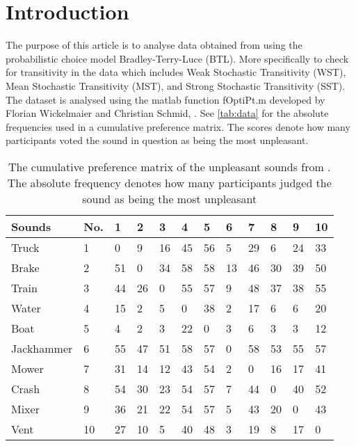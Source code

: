 \section*{Introduction}
\label{Introduktion}

The purpose of this article is to analyse data obtained from \textcite{Ellermeier2004} using the probabilistic choice model Bradley-Terry-Luce (BTL). More specifically to check for transitivity in the data which includes Weak Stochastic Transitivity (WST), Mean Stochastic Transitivity (MST), and Strong Stochastic Transitivity (SST). The dataset is analysed using the matlab function fOptiPt.m developed by Florian Wickelmaier and Christian Schmid, \parencite{Wickelmaier2004}. See \autoref{tab:data} for the absolute frequencies used in a cumulative preference matrix. The scores denote how many participants voted the sound in question as being the most unpleasant.

\begin{table}[H]
\centering
\begin{tabular}{@{}llllllllllll@{}}
\toprule
Sounds     & No. & 1  & 2  & 3  & 4  & 5  & 6  & 7  & 8  & 9  & 10 \\ \midrule
Truck      & 1   & 0  & 9  & 16 & 45 & 56 & 5  & 29 & 6  & 24 & 33 \\
Brake      & 2   & 51 & 0  & 34 & 58 & 58 & 13 & 46 & 30 & 39 & 50 \\
Train      & 3   & 44 & 26 & 0  & 55 & 57 & 9  & 48 & 37 & 38 & 55 \\
Water      & 4   & 15 & 2  & 5  & 0  & 38 & 2  & 17 & 6  & 6  & 20 \\
Boat       & 5   & 4  & 2  & 3  & 22 & 0  & 3  & 6  & 3  & 3  & 12 \\
Jackhammer & 6   & 55 & 47 & 51 & 58 & 57 & 0  & 58 & 53 & 55 & 57 \\
Mower      & 7   & 31 & 14 & 12 & 43 & 54 & 2  & 0  & 16 & 17 & 41 \\
Crash      & 8   & 54 & 30 & 23 & 54 & 57 & 7  & 44 & 0  & 40 & 52 \\
Mixer      & 9   & 36 & 21 & 22 & 54 & 57 & 5  & 43 & 20 & 0  & 43 \\
Vent       & 10  & 27 & 10 & 5  & 40 & 48 & 3  & 19 & 8  & 17 & 0  \\ \bottomrule
\end{tabular}
\caption{The cumulative preference matrix of the unpleasant sounds from \textcite{Ellermeier2004}. The absolute frequency denotes how many participants judged the sound as being the most unpleasant}
\label{tab:data}
\end{table} 

